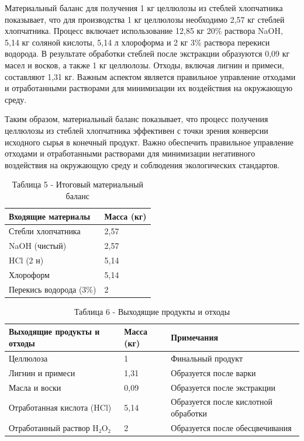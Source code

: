 \begin{multicols}{2}
Материальный баланс для получения 1 кг целлюлозы из стеблей хлопчатника
показывает, что для производства 1 кг целлюлозы необходимо 2,57 кг
стеблей хлопчатника. Процесс включает использование 12,85 кг 20\%
раствора NaOH, 5,14 кг соляной кислоты, 5,14 л хлороформа и 2 кг 3\%
раствора перекиси водорода. В результате обработки стеблей после
экстракции образуются 0,09 кг масел и восков, а также 1 кг целлюлозы.
Отходы, включая лигнин и примеси, составляют 1,31 кг. Важным аспектом
является правильное управление отходами и отработанными растворами для
минимизации их воздействия на окружающую среду.

Таким образом, материальный баланс показывает, что процесс получения
целлюлозы из стеблей хлопчатника эффективен с точки зрения конверсии
исходного сырья в конечный продукт. Важно обеспечить правильное
управление отходами и отработанными растворами для минимизации
негативного воздействия на окружающую среду и соблюдения экологических
стандартов.
\end{multicols}

\begin{table}[H]
\caption*{Таблица 5 - Итоговый материальный баланс}
\centering
\begin{tabular}{|l|l|}
\hline
Входящие материалы      & Масса (кг) \\ \hline
Стебли хлопчатника      & 2,57       \\ \hline
NaOH (чистый)           & 2,57       \\ \hline
HCl (2 н)               & 5,14       \\ \hline
Хлороформ               & 5,14       \\ \hline
Перекись водорода (3\%) & 2          \\ \hline
\end{tabular}
\end{table}

\begin{table}[H]
\caption*{Таблица 6 - Выходящие продукты и отходы}
\centering
\begin{tabular}{|l|l|l|}
\hline
Выходящие продукты и отходы & Масса (кг) & Примечания                           \\ \hline
Целлюлоза                   & 1          & Финальный продукт                    \\ \hline
Лигнин и примеси            & 1,31       & Образуется после варки               \\ \hline
Масла и воски               & 0,09       & Образуется после экстракции          \\ \hline
Отработанная кислота (HCl)  & 5,14       & Образуется после кислотной обработки \\ \hline
Отработанный раствор H₂O₂   & 2          & Образуется после обесцвечивания      \\ \hline
\end{tabular}
\end{table}

